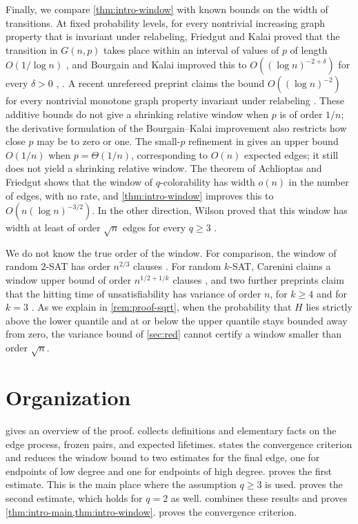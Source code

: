Finally, we compare \cref{thm:intro-window} with known bounds on the width of transitions. At fixed probability levels, for every nontrivial increasing graph property that is invariant under relabeling, Friedgut and Kalai proved that the transition in $G(n, p)$ takes place within an interval of values of $p$ of length $O(1/\log n)$ \cite[Theorem~1.1, p.~2993]{friedgut1996every}, and Bourgain and Kalai improved this to $O((\log n)^{-2 + \delta})$ for every $\delta > 0$ \cite{bourgain1997influences}, \cite[Theorem~1]{bourgain1999threshold}. A recent unrefereed preprint claims the bound $O((\log n)^{-2})$ for every nontrivial monotone graph property invariant under relabeling \cite[Theorem~1.1]{openai2026graphthreshold}. These additive bounds do not give a shrinking relative window when $p$ is of order $1/n$; the derivative formulation of the Bourgain--Kalai improvement also restricts how close $p$ may be to zero or one. The small-$p$ refinement in \cite[Corollary~3.3, p.~2996]{friedgut1996every} gives an upper bound $O(1/n)$ when $p = \Theta(1/n)$, corresponding to $O(n)$ expected edges; it still does not yield a shrinking relative window. The theorem of Achlioptas and Friedgut shows that the window of $q$-colorability has width $o(n)$ in the number of edges, with no rate, and \cref{thm:intro-window} improves this to $O(n (\log n)^{-3/2})$. In the other direction, Wilson proved that this window has width at least of order $\sqrt{n}$ edges for every $q \ge 3$ \cite[Corollary~6]{wilson2002critical}.

We do not know the true order of the window. For comparison, the window of random $2$-SAT has order $n^{2/3}$ clauses \cite[Theorem~1.1]{bollobas2001scaling}. For random $k$-SAT, Carenini claims a window upper bound of order $n^{1/2 + 1/k}$ clauses \cite[Theorem~1.1]{carenini2026polynomial}, and two further preprints claim that the hitting time of unsatisfiability has variance of order $n$, for $k \ge 4$ \cite[Theorem~1.1]{openai2026variance} and for $k = 3$ \cite[Theorem~1.1]{openai2026linear}. As we explain in \cref{rem:proof-sqrt}, when the probability that $H$ lies strictly above the lower quantile and at or below the upper quantile stays bounded away from zero, the variance bound of \cref{sec:red} cannot certify a window smaller than order $\sqrt n$.

\section{Organization}\label{sec:intro-organization}

 gives an overview of the proof.  collects definitions and elementary facts on the edge process, frozen pairs, and expected lifetimes.  states the convergence criterion and reduces the window bound to two estimates for the final edge, one for endpoints of low degree and one for endpoints of high degree.  proves the first estimate. This is the main place where the assumption $q \ge 3$ is used.  proves the second estimate, which holds for $q = 2$ as well.  combines these results and proves \cref{thm:intro-main,thm:intro-window}.  proves the convergence criterion.
